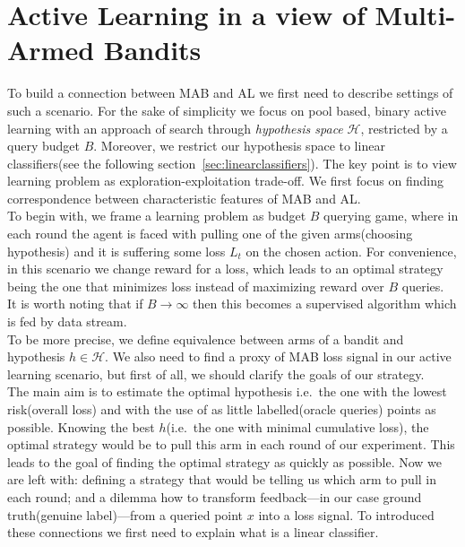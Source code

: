 \documentclass[12pt, a4paper, pdflatex, leqno, twoside]{report}
\begin{document}
\section{Active Learning in a view of Multi-Armed Bandits}
To build a connection between MAB and AL we first need to describe settings of 
such a scenario. For the sake of simplicity we focus on pool based, binary active 
learning with an approach of search through \emph{hypothesis space} 
$\mathscr{H}$, restricted by a query budget $B$. Moreover, we restrict our 
hypothesis space to linear classifiers(see the following 
section~\ref{sec:linearclassifiers}). The key point is to view learning problem 
as exploration-exploitation trade-off. We first focus on finding 
correspondence between characteristic features of MAB and AL.\\

To begin with, we frame a learning problem as budget $B$ querying game, where in each round the agent is faced with pulling one 
of the given arms(choosing hypothesis) and it is suffering some loss $L_t$ on the chosen action. For convenience, in 
this scenario we change reward for a loss, which leads to an optimal strategy being 
the one that minimizes loss instead of maximizing reward over $B$ queries.\\

It is worth noting that if $B \rightarrow \infty$ then this becomes a supervised 
algorithm which is fed by data stream.\\

To be more precise, we define equivalence between arms of a bandit and 
hypothesis $\mathit{h} \in \mathscr{H}$. We also need to find a proxy of MAB 
loss signal in our active learning scenario, but first of all, we should clarify the goals of 
our strategy.\\
The main aim is to estimate the optimal hypothesis i.e.\ the one with the lowest risk(overall loss) and with the use of as little labelled(oracle queries) points as possible. Knowing the best 
$\mathit{h}$(i.e.\ the one with minimal cumulative loss), the optimal strategy 
would be to pull this arm in each round of our experiment. This leads to the 
goal of finding the optimal strategy as quickly as possible. Now we are left with: 
defining a strategy that would be telling us which arm to pull in each round; and a dilemma how 
to transform feedback---in our case ground truth(genuine label)---from a
queried point $x$ into a loss signal. To introduced these connections we first need to explain what is a linear classifier.\\
\end{document}
